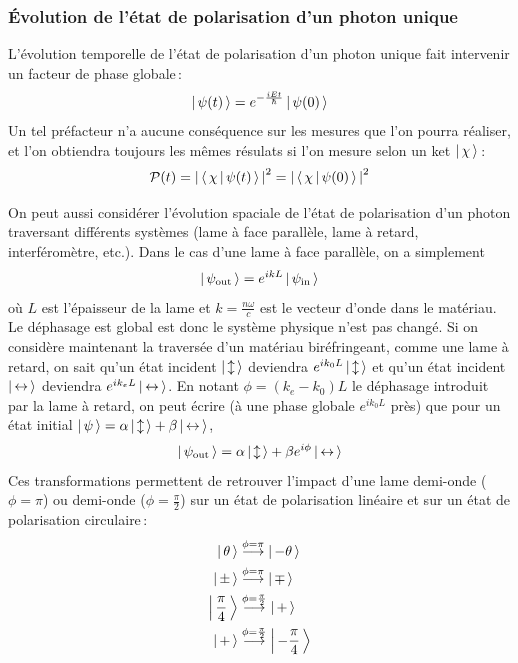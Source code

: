         \subsubsection{Évolution de l’état de polarisation d’un photon unique}

        L’évolution temporelle de l’état de polarisation d’un photon unique fait intervenir un facteur de phase globale :
        \[ \left| \, \psi(t) \, \right> = e^{-\frac{iEt}{\hbar}} \left| \, \psi(0) \, \right> \]   
        Un tel préfacteur n’a aucune conséquence sur les mesures que l’on pourra réaliser, et l’on obtiendra toujours les mêmes résulats si l’on mesure selon un ket $\left| \, \chi \, \right>$ :
        \[ \mathcal{P}(t) = \left\lvert \, \left< \, \chi \, \middle| \, \psi(t) \, \right> \, \right\rvert^2 = \left\lvert \, \left< \, \chi \, \middle| \, \psi(0) \, \right> \, \right\rvert^2 \]   

        On peut aussi considérer l’évolution spaciale de l’état de polarisation d’un photon traversant différents systèmes (lame à face parallèle, lame à retard, interféromètre, etc.). Dans le cas d’une lame à face parallèle, on a simplement 
        \[ \left| \, \psi_{\text{out}} \, \right> = e^{i k L} \left| \, \psi_{\text{in}} \, \right> \]   
        où $L$ est l’épaisseur de la lame et $k = \frac{n\omega}{c}$ est le vecteur d’onde dans le matériau. Le déphasage est global est donc le système physique n’est pas changé. Si on considère maintenant la traversée d’un matériau biréfringeant, comme une lame à retard, on sait qu’un état incident $\left| \, \updownarrow \, \right>$ deviendra $e^{i k_0 L} \left| \, \updownarrow \, \right>$ et qu’un état incident $\left| \, \leftrightarrow \, \right>$ deviendra $e^{i k_e L} \left| \, \leftrightarrow \, \right>$. En notant $\phi = (k_e - k_0) L$ le déphasage introduit par la lame à retard, on peut écrire (à une phase globale $e^{i k_0 L}$ près) que pour un état initial $\left| \, \psi \, \right> = \alpha \left| \, \updownarrow \, \right> + \beta \left| \, \leftrightarrow \, \right>$, 
        \[ \left| \, \psi_{\text{out}} \, \right> = \alpha \left| \, \updownarrow \, \right> + \beta e^{i \phi} \left| \, \leftrightarrow \, \right> \]  
        Ces transformations permettent de retrouver l’impact d’une lame demi-onde ($\phi = \pi$) ou demi-onde ($\phi = \frac{\pi}{2}$) sur un état de polarisation linéaire et sur un état de polarisation circulaire :
        \begin{align*}
            \left| \, \theta \, \right> &\overset{\phi = \pi}{\longrightarrow} \left| \, -\theta \, \right> \\
            \left| \, \pm \, \right> &\overset{\phi = \pi}{\longrightarrow} \left| \, \mp \, \right> \\
            \left| \, \frac{\pi}{4} \, \right> &\overset{\phi = \frac{\pi}{2}}{\longrightarrow} \left| \, + \, \right> \\
            \left| \, + \, \right> &\overset{\phi = \frac{\pi}{2}}{\longrightarrow} \left| \, - \frac{\pi}{4} \, \right>
        \end{align*}
       
